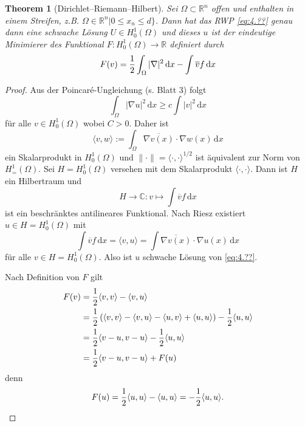 \documentclass[
paper=a4,
bibtotocnumbered,
liststotocnumbered,
tablecaptionabove,
pointlessnumbers,
twoside,
openright,
10pt
]
{report}
\let\Re\relax\let\Im\relax
\DeclareMathOperator{\Re}{Re}
\DeclareMathOperator{\Im}{Im}
\newtheorem{thm}{Theorem}[chapter]
\theoremstyle{definition}
\numberwithin{equation}{chapter}
\begin{document}
\begin{thm}[Dirichlet--Riemann--Hilbert]
Sei $\Omega \subset \mathbb R^n$ offen und enthalten in einem Streifen, z.B. $\Omega \in \mathbb R^n|0\le x_n\le d\}$. Dann hat das RWP \eqref{eq:4.??} genau dann eine schwache Lösung $U\in H_0^1(\Omega)$ und dieses $u$ ist der eindeutige Minimierer des Funktional $F: H_0^1(\Omega) \to \mathbb R$ definiert durch
\begin{equation}
F(v) = \frac{1}{2} \int_\Omega |\nabla|^2\, \mathrm dx - \Re \int \overline v f\, \mathrm dx
\end{equation}
\end{thm}
\begin{proof}
Aus der Poincar\'e-Ungleichung (s. Blatt 3) folgt
\begin{equation}
\int_\Omega |\nabla u|^2\, \mathrm dx \ge c \int |v|^2\, \mathrm dx
\end{equation}
für alle $v\in H_0^1(\Omega)$ wobei $C>0$. Daher ist
\begin{equation}
\langle v,w\rangle := \int_\Omega \overline{\nabla v(x)} \cdot \nabla w(x) \, \mathrm dx
\end{equation}
ein Skalarprodukt in $H_0^1(\Omega)$ und $\| \cdot \| = \langle\cdot ,\cdot \rangle ^{1/2}$ ist äquivalent zur Norm von $H_=^1(\Omega)$. Sei $H= H_0^1(\Omega)$ versehen mit dem Skalarprodukt $\langle \cdot, \cdot \rangle$. Dann ist $H$ ein Hilbertraum und 
\begin{equation}
H\to \mathbb C: v\mapsto \int \overline v f\, \mathrm dx
\end{equation}
ist ein beschränktes antilineares Funktional. Nach Riesz existiert $u\in H=H_0^1(\Omega)$ mit
\begin{equation}
\int \overline v f \, \mathrm dx = \langle v, u\rangle = \int \overline{\nabla v(x)} \cdot \nabla u(x) \, \mathrm dx
\end{equation}
für alle $v\in H=H_0^1(\Omega)$. Also ist $u$ schwache Lösung von \eqref{eq:4.??}.

Nach Definition von $F$ gilt
\begin{align}
F(v) &= \frac{1}{2} \langle v,v\rangle - \Re \langle v, u\rangle\\
&= \frac{1}{2} \left ( \langle v,v\rangle - \langle v, u\rangle - \langle u,v\rangle + \langle u,u\rangle \right ) - \frac{1}{2} \langle u,u\rangle\\
&= \frac{1}{2} \langle v-u, v-u \rangle - \frac{1}{2} \langle u, u\rangle \\
&= \frac{1}{2} \langle v-u, v-u\rangle + F(u)
\end{align}
denn
\begin{equation}
F(u) = \frac{1}{2} \langle u, u\rangle - \Re \langle u, u\rangle = - \frac{1}{2} \langle u, u \rangle.
\end{equation}
\end{proof}
\end{document}
